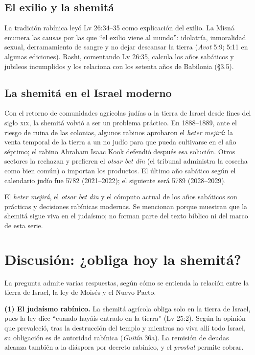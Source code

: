 \documentclass[11pt,letterpaper]{article}
\begin{document}
\subsection{El exilio y la shemitá}
La tradición rabínica leyó Lv 26:34--35 como explicación del exilio. La Misná enumera las causas por las que ``el exilio viene al mundo'': idolatría, inmoralidad sexual, derramamiento de sangre y no dejar descansar la tierra (\emph{Avot} 5:9; 5:11 en algunas ediciones). Rashi, comentando Lv 26:35, calcula los años sabáticos y jubileos incumplidos y los relaciona con los setenta años de Babilonia (§3.5).

\subsection{La shemitá en el Israel moderno}
Con el retorno de comunidades agrícolas judías a la tierra de Israel desde fines del siglo \textsc{xix}, la shemitá volvió a ser un problema práctico. En 1888--1889, ante el riesgo de ruina de las colonias, algunos rabinos aprobaron el \emph{heter mejirá}: la venta temporal de la tierra a un no judío para que pueda cultivarse en el año séptimo; el rabino Abraham Isaac Kook defendió después esa solución. Otros sectores la rechazan y prefieren el \emph{otsar bet din} (el tribunal administra la cosecha como bien común) o importan los productos. El último año sabático según el calendario judío fue 5782 (2021--2022); el siguiente será 5789 (2028--2029).

\begin{nota}[Precisión]
El \emph{heter mejirá}, el \emph{otsar bet din} y el cómputo actual de los años sabáticos son prácticas y decisiones rabínicas modernas. Se mencionan porque muestran que la shemitá sigue viva en el judaísmo; no forman parte del texto bíblico ni del marco de esta serie.
\end{nota}

\section{Discusión: ¿obliga hoy la shemitá?}

La pregunta admite varias respuestas, según cómo se entienda la relación entre la tierra de Israel, la ley de Moisés y el Nuevo Pacto.

\textbf{(1) El judaísmo rabínico.} La shemitá agrícola obliga solo en la tierra de Israel, pues la ley dice ``cuando hayáis entrado en la tierra'' (Lv 25:2). Según la opinión que prevaleció, tras la destrucción del templo y mientras no viva allí todo Israel, su obligación es de autoridad rabínica (\emph{Guitín} 36a). La remisión de deudas alcanza también a la diáspora por decreto rabínico, y el \emph{prosbul} permite cobrar.
\end{document}
